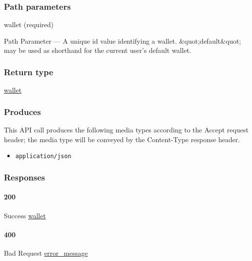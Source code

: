 \hypertarget{path-parameters-10}{%
\subsubsection{Path parameters}\label{path-parameters-10}}

wallet (required)

{Path Parameter} --- A unique id value identifying a wallet.
\&quot;default\&quot; may be used as shorthand for the current user's
default wallet.

\hypertarget{return-type-13}{%
\subsubsection{Return type}\label{return-type-13}}

\protect\hyperlink{wallet}{wallet}

\hypertarget{produces-17}{%
\subsubsection{Produces}\label{produces-17}}

This API call produces the following media types according to the
{Accept} request header; the media type will be conveyed by the
{Content-Type} response header.

\begin{itemize}
\tightlist
\item
  \texttt{application/json}
\end{itemize}

\hypertarget{responses-17}{%
\subsubsection{Responses}\label{responses-17}}

\hypertarget{section-56}{%
\paragraph{200}\label{section-56}}

Success \protect\hyperlink{wallet}{wallet}

\hypertarget{section-57}{%
\paragraph{400}\label{section-57}}

Bad Request \protect\hyperlink{error_message}{error\_message}

